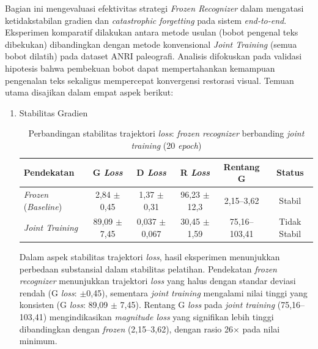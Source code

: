 \documentclass[12pt,a4paper]{article}
\begin{document}
Bagian ini mengevaluasi efektivitas strategi \textit{Frozen Recognizer} dalam mengatasi ketidakstabilan gradien dan \textit{catastrophic forgetting} pada sistem \textit{end-to-end}. Eksperimen komparatif dilakukan antara metode usulan (bobot pengenal teks dibekukan) dibandingkan dengan metode konvensional \textit{Joint Training} (semua bobot dilatih) pada dataset ANRI paleografi. Analisis difokuskan pada validasi hipotesis bahwa pembekuan bobot dapat mempertahankan kemampuan pengenalan teks sekaligus mempercepat konvergensi restorasi visual. Temuan utama disajikan dalam empat aspek berikut:
\begin{enumerate}[leftmargin=1.5em, labelsep=0.5em, itemindent=0pt, noitemsep, topsep=0pt, label=\arabic*., leftmargin=0.8cm]

    

    \item Stabilitas Gradien


          \begin{table}[!htbp]
              \caption[Perbandingan \textit{loss frozen} berbanding \textit{joint}]{Perbandingan stabilitas trajektori \textit{loss}: \textit{frozen recognizer} berbanding \textit{joint training} (20 \textit{epoch})}
              \label{tab:frozen-vs-joint-loss}
              \small
              \setlength{\tabcolsep}{3pt}
              \begin{tabularx}{\textwidth}{|>{\raggedright\arraybackslash}X|c|c|c|c|c|}
                  \hline
                  \textbf{Pendekatan}        & \textbf{G \textit{Loss}}           & \textbf{D \textit{Loss}}            & \textbf{R \textit{Loss}}           & \textbf{Rentang G}     & \textbf{Status}       \\
                  \hline
                  \textit{Frozen} (\textit{Baseline}) & 2,84 $\pm$ 0,45  & 1,37 $\pm$ 0,31   & 96,23 $\pm$ 12,3 & 2,15--3,62    & Stabil       \\
                  \textit{Joint Training}    & 89,09 $\pm$ 7,45 & 0,037 $\pm$ 0,067 & 30,45 $\pm$ 1,59 & 75,16--103,41 & Tidak Stabil \\
                  \hline
              \end{tabularx}
          \end{table}

          Dalam aspek stabilitas trajektori \textit{loss}, hasil eksperimen menunjukkan perbedaan substansial dalam stabilitas pelatihan. Pendekatan \textit{frozen recognizer} menunjukkan trajektori \textit{loss} yang halus dengan standar deviasi rendah (G \textit{loss}: $\pm$0,45), sementara \textit{joint training} mengalami nilai tinggi yang konsisten (G \textit{loss}: 89,09 $\pm$ 7,45). Rentang G \textit{loss} pada \textit{joint training} (75,16--103,41) mengindikasikan \textit{magnitude loss} yang signifikan lebih tinggi dibandingkan dengan \textit{frozen} (2,15--3,62), dengan rasio 26$\times$ pada nilai minimum.


\end{enumerate}
\end{document}
